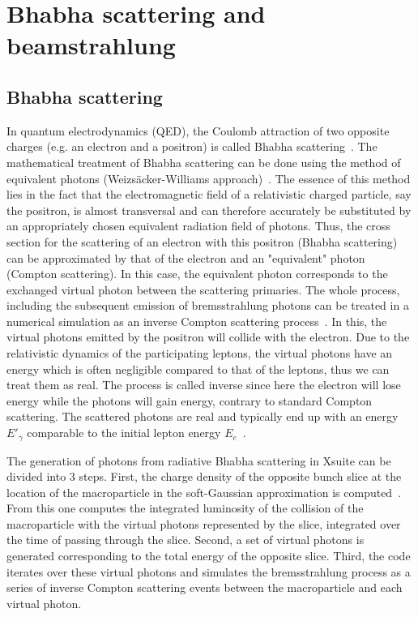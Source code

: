 \chapter{Bhabha scattering and beamstrahlung}

\section{Bhabha scattering}
In quantum electrodynamics (QED), the Coulomb attraction of two opposite charges (e.g. an electron and a positron) is called Bhabha scattering~\cite{Griffiths:111880}. The mathematical treatment of Bhabha scattering can be done using the method of equivalent photons (Weizsäcker-Williams approach)~\cite{Weizsacker1934, Williams:1935dka}. The essence of this method lies in the fact that the electromagnetic field of a relativistic charged particle, say the positron, is almost transversal and can therefore accurately be substituted by an appropriately chosen equivalent radiation field of photons. Thus, the cross section for the scattering of an electron with this positron (Bhabha scattering) can be approximated by that of the electron and an "equivalent" photon (Compton scattering). In this case, the equivalent photon corresponds to the exchanged virtual photon between the scattering primaries. The whole process, including the subsequent emission of bremsstrahlung photons can be treated in a numerical simulation as an inverse Compton scattering process~\cite{Schulte:331845}. In this, the virtual photons emitted by the positron will collide with the electron. Due to the relativistic dynamics of the participating leptons, the virtual photons have an energy which is often negligible compared to that of the leptons, thus we can treat them as real. The process is called inverse since here the electron will lose energy while the photons will gain energy, contrary to standard Compton scattering. The scattered photons are real and typically end up with an energy $E'_{\gamma}$ comparable to the initial lepton energy $E_e$~\cite{ARUTYUNIAN1963176}.

The generation of photons from radiative Bhabha scattering in Xsuite can be divided into 3 steps. First, the charge density of the opposite bunch slice at the location of the macroparticle in the soft-Gaussian approximation is computed~\cite{Bassetti:122227}. From this one computes the integrated luminosity of the collision of the macroparticle with the virtual photons represented by the slice, integrated over the time of passing through the slice. Second, a set of virtual photons is generated corresponding to the total energy of the opposite slice. Third, the code iterates over these virtual photons and simulates the bremsstrahlung process as a series of inverse Compton scattering events between the macroparticle and each virtual photon. 


